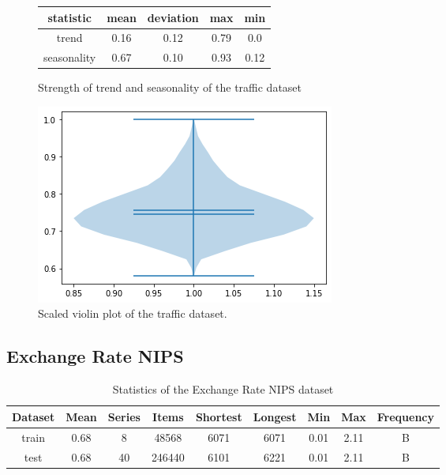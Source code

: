 \begin{figure}[htb]
    \centering
        \begin{center}
            \begin{tabular}{||c | c | c | c | c |} 
                \hline
                statistic & mean & deviation & max & min\\
                \hline
                trend & 0.16 & 0.12 & 0.79 & 0.0 \\
                \hline
                seasonality & 0.67 & 0.10 & 0.93 & 0.12 \\
                \hline
                \hline
            \end{tabular}
            \caption{Strength of trend and seasonality of the traffic dataset}
        \end{center}
    \endminipage\hfill
      \includegraphics[width=\linewidth]{4_designing/figures/traffic_violin.png}
      \caption{Scaled violin plot of the traffic dataset.}
      \label{fig:traffic_violin}
    \endminipage\hfill
\end{figure}

\clearpage
\subsection{Exchange Rate NIPS}
\begin{table}[htb]
    \begin{tabular}{||c | c c c c c c c c ||} 
        \hline
       Dataset & Mean & Series & Items & Shortest & Longest & Min & Max & Frequency\\ [0.5ex] 
        \hline\hline
        train & 0.68 & 8 & 48568 & 6071 & 6071 & 0.01 & 2.11 & B\\ 
        \hline
        test & 0.68 & 40 & 246440 & 6101 & 6221 & 0.01 & 2.11 & B\\
        \hline
    \end{tabular}
   \caption{Statistics of the Exchange Rate NIPS dataset}    
\end{table}

